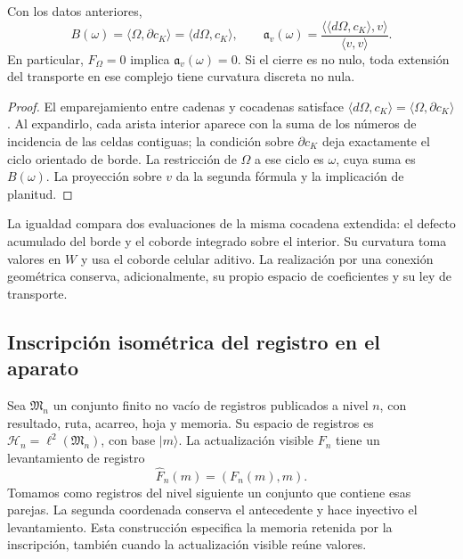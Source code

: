 \begin{theorem}
\label{vii:vii:thm:observador-stokes}
Con los datos anteriores,
\begin{equation}
 B(\omega)=\langle\Omega,\partial c_K\rangle
          =\langle d\Omega,c_K\rangle,
 \qquad
 \mathfrak a_v(\omega)
 =\frac{\langle\langle d\Omega,c_K\rangle,v\rangle}
        {\langle v,v\rangle}.
 \label{vii:vii:eq:observador-stokes}
\end{equation}
En particular, \(F_\Omega=0\) implica \(\mathfrak a_v(\omega)=0\).
Si el cierre es no nulo, toda extensión del transporte en ese complejo
tiene curvatura discreta no nula.
\end{theorem}

\begin{proof}
El emparejamiento entre cadenas y cocadenas satisface
\(\langle d\Omega,c_K\rangle=\langle\Omega,\partial c_K\rangle\).
Al expandirlo, cada arista interior aparece con la suma de los números
de incidencia de las celdas contiguas; la condición sobre
\(\partial c_K\) deja exactamente el ciclo orientado de borde.
La restricción de \(\Omega\) a ese ciclo es \(\omega\), cuya suma
es \(B(\omega)\). La proyección sobre \(v\) da la segunda fórmula
y la implicación de planitud.
\end{proof}

La igualdad compara dos evaluaciones de la misma cocadena extendida:
el defecto acumulado del borde y el coborde integrado sobre el interior.
Su curvatura toma valores en \(W\) y usa el coborde celular aditivo.
La realización por una conexión geométrica conserva, adicionalmente,
su propio espacio de coeficientes y su ley de transporte.

\subsection{Inscripción isométrica del registro en el aparato}
\label{vii:vii:sec:observador-aparato}

Sea \(\mathfrak M_n\) un conjunto finito no vacío de registros
publicados a nivel \(n\), con resultado, ruta, acarreo, hoja y memoria.
Su espacio de registros es
\(\mathcal H_n=\ell^2(\mathfrak M_n)\), con base \(|m\rangle\).
La actualización visible \(F_n\) tiene un levantamiento de registro
\[
 \widehat F_n(m)=(F_n(m),m).
\]
Tomamos como registros del nivel siguiente un conjunto que contiene esas
parejas. La segunda coordenada conserva el antecedente y hace inyectivo
el levantamiento. Esta construcción especifica la memoria retenida por
la inscripción, también cuando la actualización visible reúne valores.

